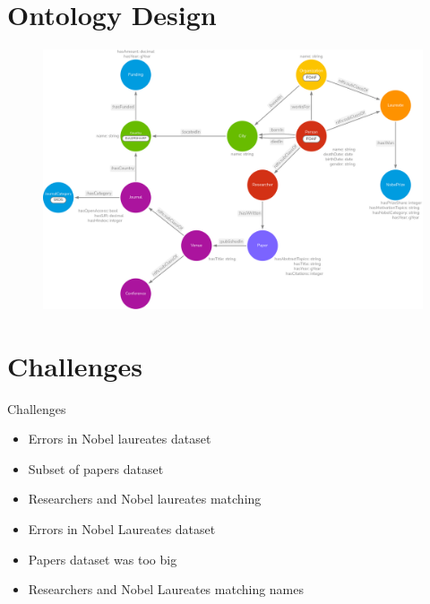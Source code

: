 \documentclass[aspectratio=169,xcolor=dvipsnames]{beamer}
\begin{document}
\section{Ontology Design}

\begin{frame}
	\begin{figure}
		\includegraphics[width=0.75\linewidth]{../nobelOntologyTransparent.png}
	\end{figure}
\end{frame}

\section{Challenges}

\begin{frame}{Challenges}
	\begin{itemize}
		\item Errors in Nobel laureates dataset
            \vspace{1em}
		\item Subset of papers dataset
            \vspace{1em}
		\item Researchers and Nobel laureates matching
		\item Errors in Nobel Laureates dataset
		\item Papers dataset was too big
		\item Researchers and Nobel Laureates matching names
	\end{itemize}
\end{frame}
\end{document}
